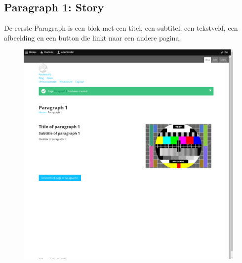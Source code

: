 \subsection{Paragraph 1: Story}
De eerste Paragraph is een blok met een titel, een subtitel, een tekstveld, een afbeelding en een button die linkt naar een andere pagina.
\begin{figure}[h]
\includegraphics[width=1\textwidth]{img/p001.png}
\end{figure}

\clearpage
